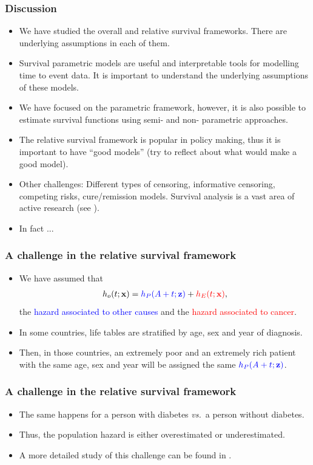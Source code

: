 \documentclass[10pt,handout,compress]{beamer}
\newcommand{\bx}{{\bf x}}
\newcommand{\bz}{{\bf z}}
\begin{document}
\begin{frame}
\frametitle{Discussion}
\begin{itemize}
\item We have studied the overall and relative survival frameworks. There are underlying assumptions in each of them. 
\pause
\item Survival parametric models are useful and interpretable tools for modelling time to event data. \pause It is important to understand the underlying assumptions of these models.
\pause
\item We have focused on the parametric framework, however, it is also possible to estimate survival functions using semi- and non- parametric approaches.
\pause
\item The relative survival framework is popular in policy making, thus it is important to have ``good models'' (try to reflect about what would make a good model).
\pause
\item Other challenges: Different types of censoring, informative censoring, competing risks, cure/remission models. Survival analysis is a vast area of active research (see \cite{eletti:2022}). 
\pause
\item In fact ...
\end{itemize}
\end{frame}


\begin{frame}
\frametitle{A challenge in the relative survival framework}
\begin{itemize}
\item We have assumed that
\begin{eqnarray*}
h_o(t;\bx) = \textcolor{blue}{h_P(A+t;\bz)} + \textcolor{red}{h_E(t;\bx)},
\end{eqnarray*}
\pause  the \textcolor{blue}{hazard associated to other causes} and the \textcolor{red}{hazard associated to cancer}.
\pause
\item In some countries, life tables are stratified by age, sex and year of diagnosis.
\pause
\item Then, in those countries, an extremely poor and an extremely rich patient with the same age, sex and year will be assigned the same $\textcolor{blue}{h_P(A+t;\bz)}$.
\end{itemize}
\end{frame}


\begin{frame}
\frametitle{A challenge in the relative survival framework}
\begin{itemize}
\item The same happens for a person with diabetes \emph{vs.}~a person without diabetes.
\pause
\item Thus, the population hazard is either overestimated or underestimated. 
\pause
\item A more detailed study of this challenge can be found in \cite{R19}.
\end{itemize}
\end{frame}
\end{document}

